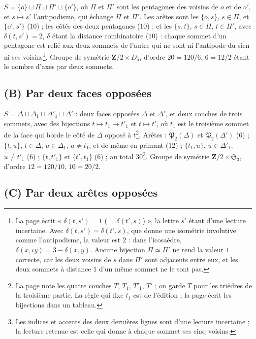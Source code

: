 \documentclass[11pt,a4paper]{article}
\begin{document}
$S = \{o\} \sqcup \Pi \sqcup \Pi' \sqcup \{o'\}$, où $\Pi$ et $\Pi'$ sont les
pentagones des voisins de $o$ et de $o'$, et $s \mapsto s'$ l'antipodisme, qui
échange $\Pi$ et $\Pi'$. Les arêtes sont les $\{o, s\}$, $s \in \Pi$, et
$\{o', s'\}$ ($10$) ; les côtés des deux pentagones ($10$) ; et les $\{s, t\}$,
$s \in \Pi$, $t \in \Pi'$, avec $\delta(t, s') = 2$, $\delta$ étant la distance
combinatoire ($10$) : chaque sommet d'un pentagone est relié aux deux sommets de
l'autre qui ne sont ni l'antipode du sien ni ses voisins\footnote{La page écrit
« $\delta(t, s') = 1$ ($= \delta(t', s)$) », la lettre $s'$ étant d'une
lecture incertaine. Avec $\delta(t,s') = \delta(t',s)$, que donne une isométrie
involutive comme l'antipodisme, la valeur est $2$ : dans l'icosaèdre,
$\delta(x, \iota y) = 3 - \delta(x, y)$. Aucune bijection $\Pi \simeq \Pi'$ ne
rend la valeur $1$ correcte, car les deux voisins de $s$ dans $\Pi'$ sont
adjacents entre eux, et les deux sommets à distance $1$ d'un même sommet ne le
sont pas.}. Groupe de symétrie $\mathbf{Z}/2 \times D_5$, d'ordre $20 = 120/6$,
$6 = 12/2$ étant le nombre d'axes par deux sommets.

\subsection*{(B) Par deux faces opposées}

$S = \Delta \sqcup \Delta_1 \sqcup \Delta'_1 \sqcup \Delta'$ : deux faces
opposées $\Delta$ et $\Delta'$, et deux couches de trois sommets, avec des
bijections $t \mapsto t_1 \mapsto t'_1$ et $t \mapsto t'$, où $t_1$ est le
troisième sommet de la face qui borde le côté de $\Delta$ opposé à
$t$\footnote{La page note les quatre couches $T$, $T_1$, $T'_1$, $T'$ ; on
garde $T$ pour les trièdres de la troisième partie. La règle qui fixe $t_1$ est
de l'édition ; la page écrit les bijections dans un tableau.}. Arêtes :
$\mathfrak{P}_2(\Delta)$ et $\mathfrak{P}_2(\Delta')$ ($6$) ; $\{t, u\}$,
$t \in \Delta$, $u \in \Delta_1$, $u \neq t_1$, et de même en primant ($12$) ;
$\{t_1, u\}$, $u \in \Delta'_1$, $u \neq t'_1$ ($6$) ; $\{t, t'_1\}$ et
$\{t', t_1\}$ ($6$) ; au total $30$\footnote{Les indices et accents des deux
dernières lignes sont d'une lecture incertaine ; la lecture retenue est celle
qui donne à chaque sommet ses cinq voisins.}. Groupe de symétrie
$\mathbf{Z}/2 \times \mathfrak{S}_3$, d'ordre $12 = 120/10$, $10 = 20/2$.

\subsection*{(C) Par deux arêtes opposées}
\end{document}
